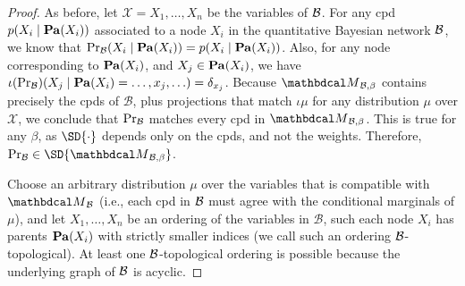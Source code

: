 \begin{proof}
As before, let $\mathcal X = X_1, \ldots, X_n$ be the variables of $\cal B$.
For any cpd $p(X_i \mid \mathbf{Pa}(X_i))$ associated to a node $X_i$ in the quantitative Bayesian network $\cal B$, we know that $\Pr_{\cal B}(X_i \mid \mathbf{Pa}(X_i)) = p(X_i \mid \mathbf{Pa}(X_i))$. 
Also, for any node corresponding to $\mathbf{Pa}(X_i)$, and $X_j \in \mathbf{Pa}(X_i)$, we have $\iota(\Pr_{\cal B}) (X_j \mid \mathbf{Pa}(X_i) = \ldots,x_j,\ldots) = \delta_{x_j}$.
Because $\PDGof{\mathcal B, \beta}$ contains precisely the cpds of $\mathcal B$, plus projections that match $\iota\mu$ for any distribution $\mu$ over $\mathcal X$, we conclude that $\Pr_{\cal B}$ matches every cpd in $\PDGof{\mathcal B,\beta}$. This is true for any $\beta$, as $\SD{\cdot}$ depends only on the cpds, and not the weights. Therefore, $\Pr_{\cal B} \in \SD{\PDGof{\mathcal B, \beta}}$.

Choose an arbitrary distribution $\mu$ over the
variables that is 
compatible with $\PDGof{\cal B}$ (i.e.,
each cpd in $\cal B$ must agree with the
conditional marginals of $\mu$), and let $X_1, \ldots,
X_n$ be an ordering of the variables in $\mathcal B$,
such each node $X_i$ has parents $\mathbf{Pa}(X_i)$ with
strictly smaller indices (we call such an ordering
$\cal B$-topological). At least one $\cal
B$-topological ordering is possible because the
underlying graph of $\cal B$ is acyclic.  


\end{proof}
